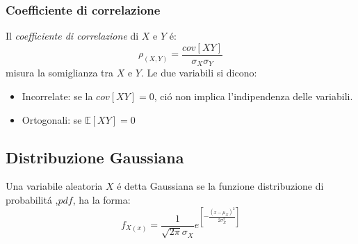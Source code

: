         \subsubsection{Coefficiente di correlazione}
            Il \emph{coefficiente di correlazione} di $X$ e $Y$ é:
            \[
                \rho_{(X,Y)} = \frac{cov[XY]}{\sigma_X\sigma_Y}
            \]
            misura la somiglianza tra $X$ e $Y$. Le due variabili si dicono:
            \begin{itemize}
                \item {
                    Incorrelate: se la $cov[XY] =0$, ció non implica l'indipendenza delle variabili.
                }
                \item {
                    Ortogonali: se $\mathbb{E}[XY] = 0$
                }
            \end{itemize}
    \subsection{Distribuzione Gaussiana}
        Una variabile aleatoria $X$ é detta Gaussiana se la funzione distribuzione di probabilitá ,$pdf$, ha la forma:
        \[
            f_{X(x)} = \frac{1}{\sqrt{2\pi}\sigma_X}e^{\left[\displaystyle -\frac{(x-\mu_X)^2}{2\sigma^2_X}\right]}  
        \]
